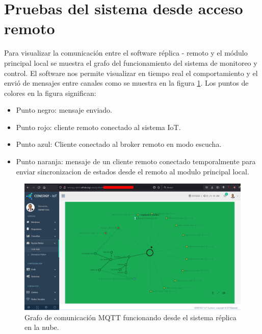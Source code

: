 \section{Pruebas del sistema desde acceso remoto}

Para visualizar la comunicación entre el software réplica - remoto y el módulo principal local se muestra el grafo del funcionamiento del sistema de monitoreo y control. El software nos permite visualizar en tiempo real el comportamiento y el envió de mensajes entre canales como se muestra en la figura \ref{fig:graforemoto}. Los puntos de colores en la figura significan:

\begin{itemize}
\item Punto negro: mensaje enviado.
\item Punto rojo: cliente remoto conectado al sistema IoT.
\item Punto azul: Cliente conectado al broker remoto en modo escucha.
\item Punto naranja: mensaje de un cliente remoto conectado temporalmente para enviar sincronizacion de estados desde el remoto al modulo principal local. 
\end{itemize}

\begin{landscape} %
\begin{figure}[htpb]
\centering 
\includegraphics[width=1.6\textwidth]{./Figures/test/replicador/remoto.png}
\caption{Grafo de comunicación MQTT funcionando desde el sistema réplica en la nube.}
\label{fig:graforemoto}
\end{figure}
\end{landscape} 

